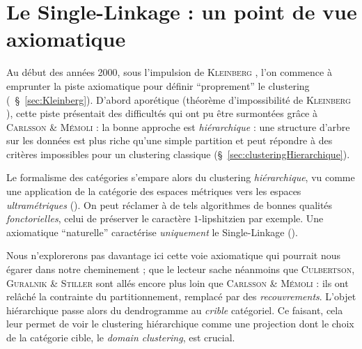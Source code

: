 \chapter{Le Single-Linkage : un point de vue axiomatique}
\label{chap:axiomatique}


Au début des années 2000, sous l'impulsion de \textsc{Kleinberg} \cite{Kleinberg2002}, l'on commence à emprunter la piste axiomatique pour définir ``proprement'' le clustering (\cf{}~\S~\ref{sec:Kleinberg}). 
D'abord aporétique (théorème d'impossibilité de \textsc{Kleinberg} \cite{Kleinberg2002}), cette piste présentait des difficultés qui ont pu être surmontées grâce à \textsc{Carlsson \& Mémoli} \cite{CarlssonMemoli2010} : la bonne approche est \emph{hiérarchique} : une structure d'arbre sur les données est plus riche qu'une simple partition et peut répondre à des critères impossibles pour un clustering classique (\S~\ref{sec:clusteringHierarchique}).

Le formalisme des catégories s'empare alors du clustering \emph{hiérarchique}, vu comme une application de la catégorie des espaces métriques vers les espaces \emph{ultramétriques} ().
On peut réclamer à de tels algorithmes de bonnes qualités \emph{fonctorielles}, celui de préserver le caractère $1$-lipshitzien par exemple. Une axiomatique ``naturelle'' caractérise \emph{uniquement} le Single-Linkage ().

Nous n'explorerons pas davantage ici cette voie axiomatique qui pourrait nous égarer dans notre cheminement ; que le lecteur sache néanmoins que \textsc{Culbertson, Guralnik \& Stiller} \cite{CulbertsonGuralnikStiller2018} sont allés encore plus loin que \textsc{Carlsson \& Mémoli} : ils ont relâché la contrainte du partitionnement, remplacé par des \emph{recouvrements}. L'objet hiérarchique passe alors du dendrogramme au \emph{crible} catégoriel.
Ce faisant, cela leur permet de voir le clustering hiérarchique comme une projection dont le choix de la catégorie cible, le \emph{domain clustering}, est crucial.




